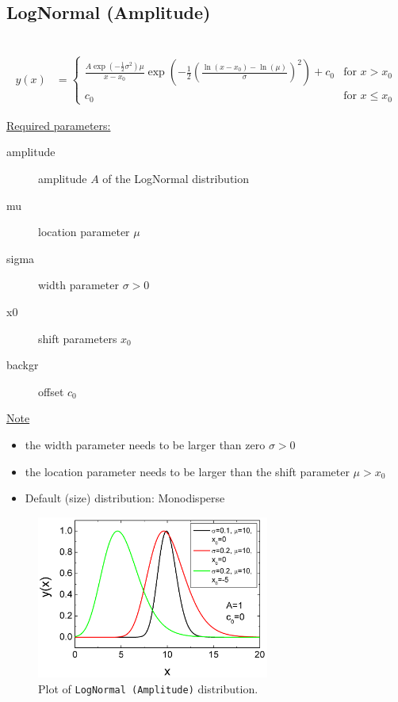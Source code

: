 \clearpage

\subsection{LogNormal (Amplitude)} ~\\
\label{sec:LogNormalAmplitude}
\begin{align}
y(x) &=
\begin{cases}
        \frac{A \exp\left(-\frac12\sigma^2\right) \mu}{x-x_0}\exp\left(-\frac{1}{2}\left(\frac{\ln (x-x_0) -
        \ln(\mu)}{\sigma}\right)^2\right) + c_0 & \mbox{for } x>x_0 \\
        c_0 & \mbox{for } x \leq x_0
\end{cases}
\end{align}

\underline{Required parameters:}
\begin{description}
    \item[amplitude] amplitude $A$ of the LogNormal distribution
    \item[mu] location parameter $\mu$
    \item[sigma] width parameter $\sigma > 0$
    \item[x0] shift parameters $x_0$
    \item[backgr] offset $c_0$
\end{description}

\underline{Note}
\begin{itemize}
  \item the width parameter needs to be larger than zero $\sigma > 0$
  \item the location parameter needs to be larger than the shift parameter $\mu > x_0$
  \item Default (size) distribution: Monodisperse
\end{itemize}

\begin{figure}[htb]
\begin{center}
\includegraphics[width=0.6824\textwidth]{LogNormalAmplitude.png}
\end{center}
\caption{Plot of \texttt{LogNormal (Amplitude)} distribution.}
\label{fig:LogNormalAmplitude}
\end{figure}

